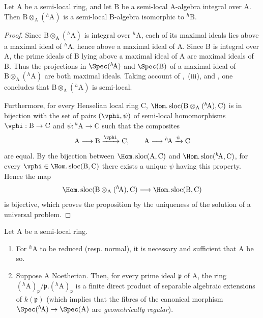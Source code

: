 \begin{proposition}[18.6.8]
\label{IV.18.6.8}
Let $\mathrm{A}$ be a semi-local ring, and let $\mathrm{B}$ be a semi-local A-algebra integral over $\mathrm{A}$.
Then $\mathrm{B}\otimes_{\mathrm{A}}({}^h\!\mathrm{A})$ is a semi-local B-algebra isomorphic to ${}^h\!\mathrm{B}$.
\end{proposition}

\begin{proof}
Since $\mathrm{B}\otimes_{\mathrm{A}}({}^h\!\mathrm{A})$ is integral over ${}^h\!\mathrm{A}$, each of its maximal ideals lies above a maximal ideal of ${}^h\!\mathrm{A}$, hence above a maximal ideal of A.  Since B is integral over A, the prime ideals of B lying above a maximal ideal of A are maximal ideals of B.  Thus the projections in $\Spec({}^h\!\mathrm{A})$ and $\Spec(\mathrm{B})$ of a maximal ideal of $\mathrm{B}\otimes_{\mathrm{A}}({}^h\!\mathrm{A})$ are both maximal ideals.  Taking account of ,~(iii), and , one concludes that $\mathrm{B}\otimes_{\mathrm{A}}({}^h\!\mathrm{A})$ is semi-local.

Furthermore, for every Henselian local ring C, $\Hom.\operatorname{sloc}(\mathrm{B}\otimes_{\mathrm{A}}({}^h\!\mathrm{A}),\mathrm{C})$ is in bijection with the set of pairs $(\vphi,\psi)$ of semi-local homomorphisms $\vphi:\mathrm{B}\to\mathrm{C}$ and $\psi:{}^h\!\mathrm{A}\to\mathrm{C}$ such that the composites
\[
  \mathrm{A}\longrightarrow\mathrm{B}\xrightarrow{\vphi}\mathrm{C},
  \qquad
  \mathrm{A}\longrightarrow{}^h\!\mathrm{A}\xrightarrow{\psi}\mathrm{C}
\]
are equal.  By the bijection between $\Hom.\operatorname{sloc}(\mathrm{A},\mathrm{C})$ and $\Hom.\operatorname{sloc}({}^h\!\mathrm{A},\mathrm{C})$, for every $\vphi\in\Hom.\operatorname{sloc}(\mathrm{B},\mathrm{C})$ there exists a unique $\psi$ having this property.  Hence the map
\[
  \Hom.\operatorname{sloc}(\mathrm{B}\otimes_{\mathrm{A}}({}^h\!\mathrm{A}),\mathrm{C})
  \longrightarrow \Hom.\operatorname{sloc}(\mathrm{B},\mathrm{C})
\]
is bijective, which proves the proposition by the uniqueness of the solution of a universal problem.
\end{proof}

\begin{theorem}[18.6.9]
\label{IV.18.6.9}
Let $\mathrm{A}$ be a semi-local ring.
\begin{enumerate}[label=\emph{\roman*)}]
  \item For ${}^h\!\mathrm{A}$ to be reduced (resp. normal), it is necessary and sufficient that A be so.
  \item Suppose A Noetherian.
  Then, for every prime ideal $\mathfrak{p}$ of A, the ring $({}^h\!\mathrm{A})_{\mathfrak{p}}/\mathfrak{p}.({}^h\!\mathrm{A})_{\mathfrak{p}}$ is a finite direct product of separable algebraic extensions of $k(\mathfrak{p})$ (which implies that the fibres of the canonical morphism $\Spec({}^h\!\mathrm{A})\to\Spec(\mathrm{A})$ are \emph{geometrically regular}).
\end{enumerate}
\end{theorem}


